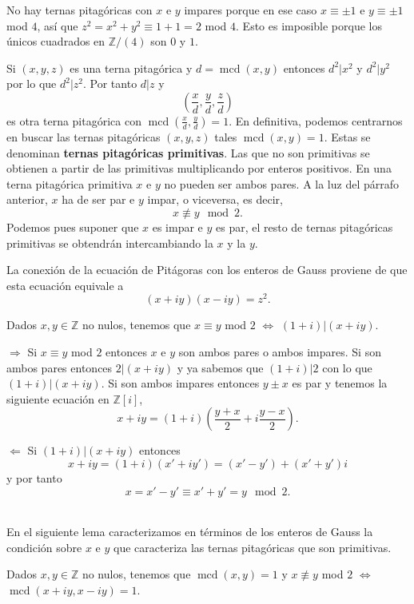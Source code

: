 No hay ternas pitagóricas con \(x\) e \(y\) impares porque en ese caso
\(x\equiv\pm 1\) e \(y\equiv \pm1\) mod \(4\), así que
\(z^2=x^2+y^2\equiv 1+1=2\) mod \(4\). Esto es imposible porque los
únicos cuadrados en \(\mathbb Z/(4)\) son \(0\) y \(1\).

Si \((x,y,z)\) es una terna pitagórica y \(d=\operatorname{mcd}(x,y)\)
entonces \(d^2|x^2\) y \(d^2|y^2\) por lo que \(d^2|z^2\). Por tanto
\(d|z\) y \[\left(\frac{x}{d},\frac{y}{d},\frac{z}{d}\right)\] es otra
terna pitagórica con \(\operatorname{mcd}(\frac{x}{d},\frac{y}{d})=1\).
En definitiva, podemos centrarnos en buscar las ternas pitagóricas
\((x,y,z)\) tales \(\operatorname{mcd}(x,y)=1\). Estas se denominan
\textbf{ternas pitagóricas primitivas}. Las que no son primitivas se
obtienen a partir de las primitivas multiplicando por enteros positivos.
En una terna pitagórica primitiva \(x\) e \(y\) no pueden ser ambos
pares. A la luz del párrafo anterior, \(x\) ha de ser par e \(y\) impar,
o viceversa, es decir, \[x\not\equiv y \mod 2.\] Podemos pues suponer
que \(x\) es impar e \(y\) es par, el resto de ternas pitagóricas
primitivas se obtendrán intercambiando la \(x\) y la \(y\).

La conexión de la ecuación de Pitágoras con los enteros de Gauss
proviene de que esta ecuación equivale a \[(x+iy)(x-iy)=z^2.\]


Dados \(x,y\in\mathbb Z\) no nulos, tenemos que \(x\equiv y\) mod \(2\)
\(\Leftrightarrow\) \((1+i)|(x+iy)\). 


\(\Rightarrow\) Si \(x\equiv y\) mod \(2\) entonces \(x\) e \(y\) son
ambos pares o ambos impares. Si son ambos pares entonces \(2|(x+iy)\) y
ya sabemos que \((1+i)|2\) con lo que \((1+i)|(x+iy)\). Si son ambos
impares entonces \(y\pm x\) es par y tenemos la siguiente ecuación en
\(\mathbb Z[i]\),
\[x+iy=(1+i)\left(\frac{y+x}{2}+i\frac{y-x}{2}\right).\]

\(\Leftarrow\) Si \((1+i)|(x+iy)\) entonces
\[x+iy=(1+i)(x'+iy')=(x'-y')+(x'+y')i\] y por tanto
\[x=x'-y'\equiv x'+y'=y \mod 2.\]\\

En el siguiente lema caracterizamos en términos de los enteros de Gauss
la condición sobre \(x\) e \(y\) que caracteriza las ternas pitagóricas
que son primitivas.

\label{lem:mcdconj} Dados \(x,y\in\mathbb Z\) no nulos,
tenemos que \(\operatorname{mcd}(x,y)=1\) y \(x\not\equiv y\) mod \(2\)
\(\Leftrightarrow\) \(\operatorname{mcd}(x+iy,x-iy)=1\). 

